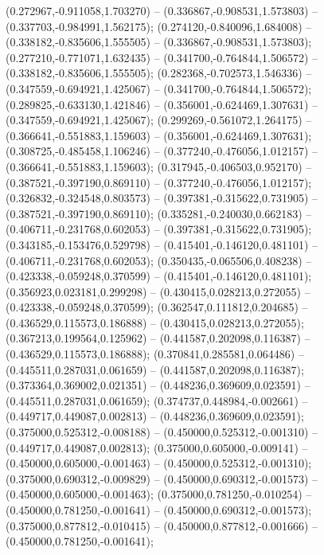  (0.272967,-0.911058,1.703270) -- (0.336867,-0.908531,1.573803) -- (0.337703,-0.984991,1.562175);
 (0.274120,-0.840096,1.684008) -- (0.338182,-0.835606,1.555505) -- (0.336867,-0.908531,1.573803);
 (0.277210,-0.771071,1.632435) -- (0.341700,-0.764844,1.506572) -- (0.338182,-0.835606,1.555505);
 (0.282368,-0.702573,1.546336) -- (0.347559,-0.694921,1.425067) -- (0.341700,-0.764844,1.506572);
 (0.289825,-0.633130,1.421846) -- (0.356001,-0.624469,1.307631) -- (0.347559,-0.694921,1.425067);
 (0.299269,-0.561072,1.264175) -- (0.366641,-0.551883,1.159603) -- (0.356001,-0.624469,1.307631);
 (0.308725,-0.485458,1.106246) -- (0.377240,-0.476056,1.012157) -- (0.366641,-0.551883,1.159603);
 (0.317945,-0.406503,0.952170) -- (0.387521,-0.397190,0.869110) -- (0.377240,-0.476056,1.012157);
 (0.326832,-0.324548,0.803573) -- (0.397381,-0.315622,0.731905) -- (0.387521,-0.397190,0.869110);
 (0.335281,-0.240030,0.662183) -- (0.406711,-0.231768,0.602053) -- (0.397381,-0.315622,0.731905);
 (0.343185,-0.153476,0.529798) -- (0.415401,-0.146120,0.481101) -- (0.406711,-0.231768,0.602053);
 (0.350435,-0.065506,0.408238) -- (0.423338,-0.059248,0.370599) -- (0.415401,-0.146120,0.481101);
 (0.356923,0.023181,0.299298) -- (0.430415,0.028213,0.272055) -- (0.423338,-0.059248,0.370599);
 (0.362547,0.111812,0.204685) -- (0.436529,0.115573,0.186888) -- (0.430415,0.028213,0.272055);
 (0.367213,0.199564,0.125962) -- (0.441587,0.202098,0.116387) -- (0.436529,0.115573,0.186888);
 (0.370841,0.285581,0.064486) -- (0.445511,0.287031,0.061659) -- (0.441587,0.202098,0.116387);
 (0.373364,0.369002,0.021351) -- (0.448236,0.369609,0.023591) -- (0.445511,0.287031,0.061659);
 (0.374737,0.448984,-0.002661) -- (0.449717,0.449087,0.002813) -- (0.448236,0.369609,0.023591);
 (0.375000,0.525312,-0.008188) -- (0.450000,0.525312,-0.001310) -- (0.449717,0.449087,0.002813);
 (0.375000,0.605000,-0.009141) -- (0.450000,0.605000,-0.001463) -- (0.450000,0.525312,-0.001310);
 (0.375000,0.690312,-0.009829) -- (0.450000,0.690312,-0.001573) -- (0.450000,0.605000,-0.001463);
 (0.375000,0.781250,-0.010254) -- (0.450000,0.781250,-0.001641) -- (0.450000,0.690312,-0.001573);
 (0.375000,0.877812,-0.010415) -- (0.450000,0.877812,-0.001666) -- (0.450000,0.781250,-0.001641);
